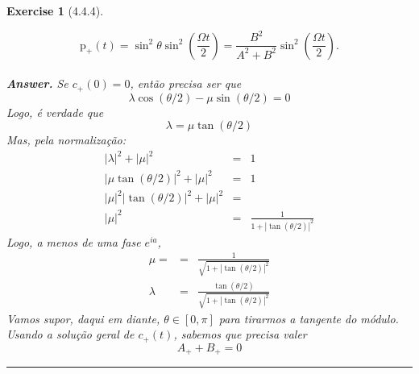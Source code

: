 \documentclass[12pt]{article}
\def\be{\begin{equation}}
\def\ee{\end{equation}}
\def\bea{\begin{eqnarray*}}
\def\eea{\end{eqnarray*}}
\def\f{\frac}
\newtheorem{exercise}{Exercise}
\newenvironment{multianswer}{\\ \noindent\textbf{\textit{Answer.}} \normalfont }{ \par\noindent\rule{0.7\textwidth}{0.1pt}}
\begin{document}
\begin{exercise}[4.4.4]
\begin{exercises}
		$$
		\mathrm{p}_{+}(t)=\sin ^{2} \theta \sin ^{2}\left(\frac{\Omega t}{2}\right)=\frac{B^{2}}{A^{2}+B^{2}} \sin ^{2}\left(\frac{\Omega t}{2}\right) .
		$$
		\begin{multianswer}
			Se $c_+(0)=0$, então precisa ser que
			\be
				 \lambda\cos(\theta/2) - \mu\sin(\theta/2) = 0
			\ee
			Logo, é verdade que
			\be
				\lambda = \mu \tan(\theta/2)
			\ee
			Mas, pela normalização:
			\bea
				|\lambda|^2 + |\mu|^2 &=& 1 \\
				|\mu\tan(\theta/2)|^2 + |\mu|^2 &=& 1 \\
				|\mu|^2|\tan(\theta/2)|^2 + |\mu|^2 &=& \\
				|\mu|^2 &=& \f{1}{1 + |\tan(\theta/2)|^2}
			\eea
			Logo, a menos de uma fase $e^{ia}$, 
			\bea
				\mu =  &=& \f{1}{\sqrt{1 + |\tan(\theta/2)|^2}} \\
				\lambda  &=& \f{\tan(\theta/2)}{\sqrt{1 + |\tan(\theta/2)|^2}}
			\eea
			Vamos supor, daqui em diante, $\theta\in[0, \pi]$ para tirarmos a tangente do módulo. Usando a solução geral de $c_+(t)$, sabemos que precisa valer
			\be
				A_+ + B_+ = 0
			\ee
			
		\end{multianswer}
		\end{exercises}
	\end{exercise}
	
	
\end{document}
